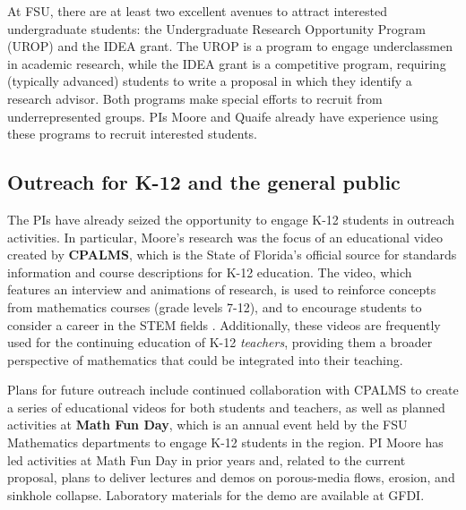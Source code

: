 \documentclass[11pt]{article}
\begin{document}
	At FSU, there are at least two excellent avenues to attract interested undergraduate students:  the Undergraduate Research Opportunity Program (UROP) and the IDEA grant. The UROP is a program to engage underclassmen in academic research, while the IDEA grant is a competitive program, requiring (typically advanced) students to write a proposal in which they identify a research advisor. Both programs make special efforts to recruit from underrepresented groups. PIs Moore and Quaife already have experience using these programs to recruit interested students.

\subsection{Outreach for K-12 and the general public}

The PIs have already seized the opportunity to engage K-12 students in outreach activities. In particular, Moore's research was the focus of an educational video created by {\bf CPALMS}, which is the State of Florida's official source for standards information and course descriptions for K-12 education. The video, which features an interview and animations of research, is used to reinforce concepts from mathematics courses (grade levels 7-12), and to encourage students to consider a career in the STEM fields \cite{CPALMS}. Additionally, these videos are frequently used for the continuing education of K-12 {\em teachers}, providing them a broader perspective of mathematics that could be integrated into their teaching.
 
Plans for future outreach include continued collaboration with CPALMS to create a series of educational videos for both students and teachers, as well as planned activities at {\bf Math Fun Day}, which is an annual event held by the FSU Mathematics departments to engage K-12 students in the region. PI Moore has led activities at Math Fun Day in prior years and, related to the current proposal, plans to deliver lectures and demos on porous-media flows, erosion, and sinkhole collapse. Laboratory materials for the demo are available at GFDI.
\end{document}
